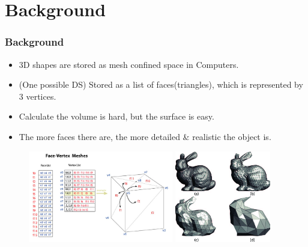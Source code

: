 \documentclass{beamer}
\begin{document}

\section{Background} %


\begin{frame}
	\frametitle{Background}
	\begin{itemize}
		\item 3D shapes are stored as mesh confined space in Computers.
		\item (One possible DS) Stored as a list of faces(triangles), which is represented by 3 vertices.
		\item Calculate the volume is hard, but the surface is easy.
		\item The more faces there are, the more detailed \& realistic the object is.
	\end{itemize}
	\begin{figure}
		\includegraphics[height=4cm]{imgs/Mesh_fv.jpg}
		\includegraphics[height=4cm]{imgs/rabbit.png}
	\end{figure}
\end{frame}
\end{document}
